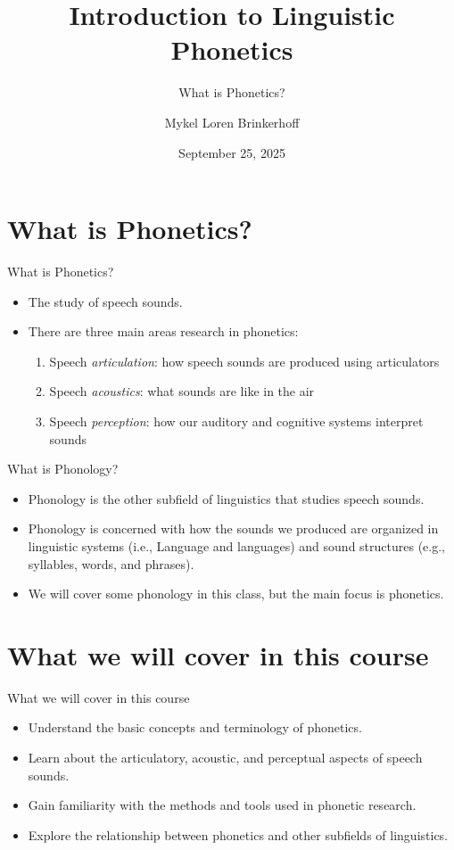 \documentclass{beamer}
\title[LING 450/550] %
{Introduction to Linguistic Phonetics}
\subtitle{What is Phonetics?}
\author[Brinkerhoff] %
{Mykel Loren Brinkerhoff}
\institute[UW] %
{University of Washington}
\date[2025-09-25] %
{September 25, 2025}
\begin{document}
\begin{frame}
  \titlepage
\end{frame}

\section{What is Phonetics?}
\begin{frame}{What is Phonetics?}
    \begin{itemize}
        \item The study of speech sounds.
        \item There are three main areas research in phonetics:
        \begin{enumerate}
            \item Speech \textit{articulation}: how speech sounds are produced using articulators
            \item Speech \textit{acoustics}: what sounds are like in the air
            \item Speech \textit{perception}: how our auditory and cognitive systems interpret sounds
        \end{enumerate}
    \end{itemize}
\end{frame}

\begin{frame}{What is Phonology?}
    \begin{itemize}
        \item Phonology is the other subfield of linguistics that studies speech sounds.
        \item Phonology is concerned with how the sounds we produced are organized in linguistic systems (i.e., Language and languages) and sound structures (e.g., syllables, words, and phrases).
        \item We will cover some phonology in this class, but the main focus is phonetics.
    \end{itemize}
\end{frame}

\section{What we will cover in this course}
\begin{frame}{What we will cover in this course}
    \begin{itemize}
        \item Understand the basic concepts and terminology of phonetics.
        \item Learn about the articulatory, acoustic, and perceptual aspects of speech sounds.
        \item Gain familiarity with the methods and tools used in phonetic research.
        \item Explore the relationship between phonetics and other subfields of linguistics.
    \end{itemize}
\end{frame}
\end{document}

